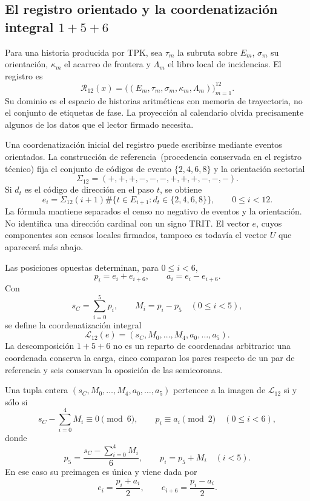 \subsection{El registro orientado y la coordenatización integral \texorpdfstring{\(1+5+6\)}{1+5+6}}
\label{subsec:k-registro-integral}

Para una historia producida por TPK, sea \(\tau_m\) la subruta sobre
\(E_m\), \(\sigma_m\) su orientación, \(\kappa_m\) el acarreo de
frontera y \(\Lambda_m\) el libro local de incidencias. El registro es
\[
 \mathcal R_{12}(x)=
 \bigl((E_m,\tau_m,\sigma_m,\kappa_m,\Lambda_m)\bigr)_{m=1}^{12}.
\]
Su dominio es el espacio de historias aritméticas con memoria de trayectoria, no el conjunto de
etiquetas de fase. La proyección al calendario olvida precisamente algunos
de los datos que el lector firmado necesita.

Una coordenatización inicial del registro puede escribirse mediante eventos
orientados. La construcción de referencia~\textup{(procedencia conservada en el registro técnico)} fija el conjunto de códigos de evento
\(\{2,4,6,8\}\) y la orientación sectorial
\[
 \Sigma_{12}=(+,+,+,-,-,-,+,+,+,-,-,-).
\]
Si \(d_t\) es el código de dirección en el paso \(t\), se obtiene
\[
 e_i=\Sigma_{12}(i+1)
 \#\{t\in E_{i+1}:d_t\in\{2,4,6,8\}\},
 \qquad0\leq i<12.
\]
La fórmula mantiene separados el censo no negativo de eventos y la
orientación. No identifica una dirección cardinal con un signo TRIT. El
vector \(e\), cuyos componentes son censos locales firmados, tampoco es
todavía el vector \(U\) que aparecerá más abajo.

Las posiciones opuestas determinan, para \(0\leq i<6\),
\[
 p_i=e_i+e_{i+6},\qquad a_i=e_i-e_{i+6}.
\]
Con
\[
 s_C=\sum_{i=0}^{5}p_i,\qquad M_i=p_i-p_5\quad(0\leq i<5),
\]
se define la coordenatización integral
\[
 \mathcal L_{12}(e)
 =(s_C,M_0,\ldots,M_4,a_0,\ldots,a_5).
\]
La descomposición \(1+5+6\) no es un reparto de coordenadas arbitrario:
una coordenada conserva la carga, cinco comparan los pares respecto de un
par de referencia y seis conservan la oposición de las semicoronas.

\begin{lemma}
\label{lem:k-carta-integral}
Una tupla entera \((s_C,M_0,\ldots,M_4,a_0,\ldots,a_5)\) pertenece a la
imagen de \(\mathcal L_{12}\) si y sólo si
\[
 s_C-\sum_{i=0}^{4}M_i\equiv0\pmod6,
 \qquad p_i\equiv a_i\pmod2\quad(0\leq i<6),
\]
donde
\[
 p_5=\frac{s_C-\sum_{i=0}^{4}M_i}{6},\qquad p_i=p_5+M_i\quad(i<5).
\]
En ese caso su preimagen es única y viene dada por
\[
 e_i=\frac{p_i+a_i}{2},\qquad e_{i+6}=\frac{p_i-a_i}{2}.
\]
\end{lemma}

